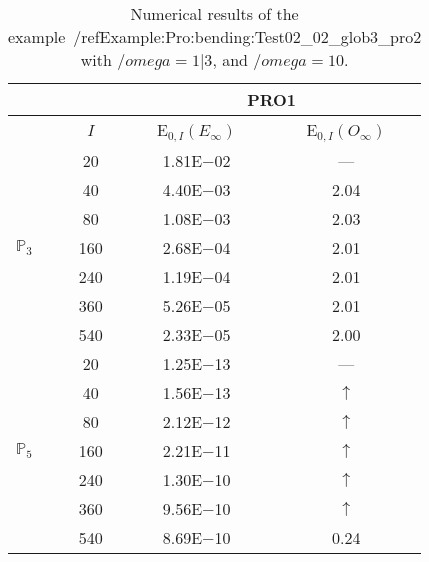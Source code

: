 \begin{table}[H]
\caption{Numerical results of the example~/ref{Example:Pro:bending:Test02_02_glob3_pro2} with $/omega=1|3$, and $/omega=10$.}
\setlength{\tabcolsep}{5pt}
\centering
\begin{tabular}{@{}l c c c@{}}
\toprule
 &  & \multicolumn{2}{c}{PRO1}\\
\midrule
 & $I$ & E$_{0,I}(E_{\infty})$ & E$_{0,I}(O_{\infty})$\\
\midrule
\multirow{7}{*}{$\mathbb{P}_{3}$}
 & 20 & 1.81E$-$02 & ---\\
 & 40 & 4.40E$-$03 & 2.04\\
 & 80 & 1.08E$-$03 & 2.03\\
 & 160 & 2.68E$-$04 & 2.01\\
 & 240 & 1.19E$-$04 & 2.01\\
 & 360 & 5.26E$-$05 & 2.01\\
 & 540 & 2.33E$-$05 & 2.00\\
\midrule
\multirow{7}{*}{$\mathbb{P}_{5}$}
 & 20 & 1.25E$-$13 & ---\\
 & 40 & 1.56E$-$13 & $\uparrow$\\
 & 80 & 2.12E$-$12 & $\uparrow$\\
 & 160 & 2.21E$-$11 & $\uparrow$\\
 & 240 & 1.30E$-$10 & $\uparrow$\\
 & 360 & 9.56E$-$10 & $\uparrow$\\
 & 540 & 8.69E$-$10 & 0.24\\
\bottomrule
\end{tabular}
\label{Table:PRO:test_02_02_test12_pro2}
\end{table}
